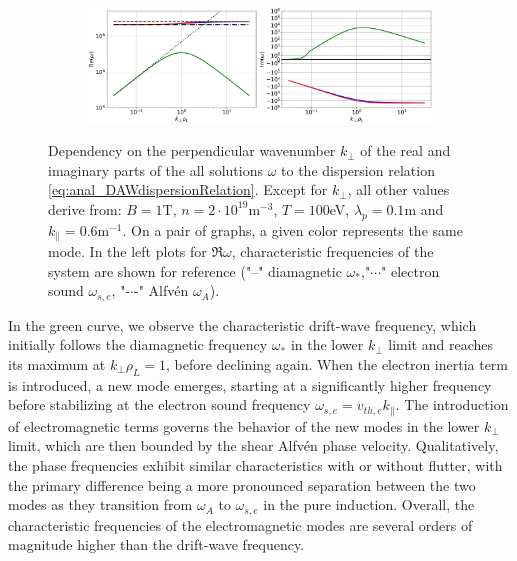 \begin{figure}[H]
	\ContinuedFloat
	\centering
	\begin{subfigure}[t]{0.85\textwidth}
		\centering
		\includegraphics[width=1\textwidth]{schemes/modes_EM-flutter.jpg}
		\label{fig:anal_modesFlutter}
	\end{subfigure}
	\caption{Dependency on the perpendicular wavenumber $k_\perp$ of the real and imaginary parts of the all solutions $\omega$ to the dispersion relation \ref{eq:anal_DAWdispersionRelation}. Except for $k_\perp$, all other values derive from: $B = 1$T, $n = 2\cdot10^{19}$m$^{-3}$, $T = 100$eV, $\lambda_p = 0.1$m and $k_\parallel = 0.6$m$^{-1}$. On a pair of graphs, a given color represents the same mode. In the left plots for $\Re{\omega}$, characteristic frequencies of the system are shown for reference ("--" diamagnetic $\omega_*$,"$\cdots$" electron sound $\omega_{s,e}$, "-$\cdot$-" Alfvén $\omega_A$).} 
	\label{fig:anal_modalBehavior}
\end{figure}

In the green curve, we observe the characteristic drift-wave frequency, which initially follows the diamagnetic frequency $\omega_*$ in the lower $k_\perp$ limit and reaches its maximum at $k_\perp \rho_L = 1$, before declining again. When the electron inertia term is introduced, a new mode emerges, starting at a significantly higher frequency before stabilizing at the electron sound frequency $\omega_{s,e} = v_{th,e} k_\parallel$. The introduction of electromagnetic terms governs the behavior of the new modes in the lower $k_\perp$ limit, which are then bounded by the shear Alfvén phase velocity. Qualitatively, the phase frequencies exhibit similar characteristics with or without flutter, with the primary difference being a more pronounced separation between the two modes as they transition from $\omega_A$ to $\omega_{s,e}$ in the pure induction. Overall, the characteristic frequencies of the electromagnetic modes are several orders of magnitude higher than the drift-wave frequency.

